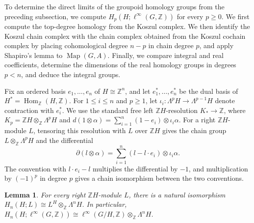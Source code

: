 \documentclass[pdflatex,sn-mathphys-num]{sn-jnl}%
\theoremstyle{plain}
\newtheorem{lemma}[theorem]{Lemma}
\theoremstyle{remark}
\theoremstyle{definition}
\numberwithin{equation}{section}
\begin{document}
To determine the direct limits of the groupoid homology groups from the preceding subsection, we compute \( H_p(H;\ell^\infty(G,\mathbb Z)) \) for every \( p\geq0 \). We first compute the top-degree homology from the Koszul complex. We then identify the Koszul chain complex with the chain complex obtained from the Koszul cochain complex by placing cohomological degree \( n-p \) in chain degree \( p \), and apply Shapiro's lemma to \( \operatorname{Map}(G,A) \). Finally, we compare integral and real coefficients, determine the dimensions of the real homology groups in degrees \( p<n \), and deduce the integral groups.

Fix an ordered basis \( e_1,\ldots,e_n \) of \( H\cong\mathbb Z^n \), and let \( e_1^*,\ldots,e_n^* \) be the dual basis of \( H^*=\operatorname{Hom}_{\mathbb Z}(H,\mathbb Z) \). For \( 1\leq i\leq n \) and \( p\geq1 \), let \( \iota_i\colon\Lambda^pH\to\Lambda^{p-1}H \) denote contraction with \( e_i^* \). We use the standard free left \( \mathbb ZH \)-resolution \( K_*\to\mathbb Z \), where \( K_p=\mathbb ZH\otimes_{\mathbb Z}\Lambda^pH \) and \( d(1\otimes\alpha)=\sum_{i=1}^n(1-e_i)\otimes\iota_i\alpha \). For a right \( \mathbb ZH \)-module \( L \), tensoring this resolution with \( L \) over \( \mathbb ZH \) gives the chain group \( L\otimes_{\mathbb Z}\Lambda^pH \) and the differential
\begin{equation}
\label{eq:translation-koszul-differential}
\partial(l\otimes\alpha)
=
\sum_{i=1}^n
(l-l\cdot e_i)\otimes\iota_i\alpha.
\end{equation}
The convention with \( l\cdot e_i-l \) multiplies the differential by \( -1 \), and multiplication by \( (-1)^p \) in degree \( p \) gives a chain isomorphism between the two conventions.

\begin{lemma}
\label{lem:top-koszul-homology}
For every right \( \mathbb ZH \)-module \( L \), there is a natural isomorphism \( H_n(H;L)\cong L^H\otimes_{\mathbb Z}\Lambda^nH \). In particular, \( H_n(H;\ell^\infty(G,\mathbb Z))\cong \ell^\infty(G/H,\mathbb Z)\otimes_{\mathbb Z}\Lambda^nH \).
\end{lemma}
\end{document}
